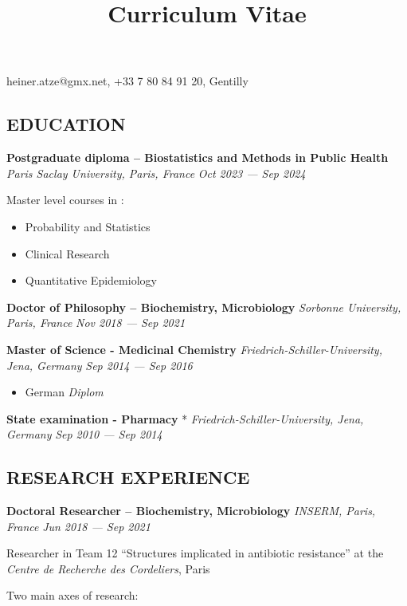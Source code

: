\documentclass[
  letterpaper,
  DIV=11,
  numbers=noendperiod]{scrartcl}
\title{Curriculum Vitae}
\author{}
\date{}
\providecommand{\tightlist}{%
  \setlength{\itemsep}{0pt}\setlength{\parskip}{0pt}}\usepackage{longtable,booktabs,array}
\begin{document}
\maketitle


heiner.atze@gmx.net, +33 7 80 84 91 20, Gentilly

\subsection{EDUCATION}\label{education}

\textbf{Postgraduate diploma -- Biostatistics and Methods in Public
Health} \emph{Paris Saclay University, Paris, France} {\emph{Oct 2023
--- Sep 2024}}

Master level courses in :

\begin{itemize}
\tightlist
\item
  Probability and Statistics
\item
  Clinical Research
\item
  Quantitative Epidemiology
\end{itemize}

\textbf{Doctor of Philosophy -- Biochemistry, Microbiology}
\emph{Sorbonne University, Paris, France} {\emph{Nov 2018 --- Sep 2021}}

\textbf{Master of Science - Medicinal Chemistry}
\emph{Friedrich-Schiller-University, Jena, Germany} {\emph{Sep 2014 ---
Sep 2016}}

\begin{itemize}
\tightlist
\item
  German \emph{Diplom}
\end{itemize}

\textbf{State examination - Pharmacy} *
\emph{Friedrich-Schiller-University, Jena, Germany} {\emph{Sep 2010 ---
Sep 2014}}

\subsection{RESEARCH EXPERIENCE}\label{research-experience}

\textbf{Doctoral Researcher -- Biochemistry, Microbiology} \emph{INSERM,
Paris, France} {\emph{Jun 2018 --- Sep 2021}}

Researcher in Team 12 ``Structures implicated in antibiotic resistance''
at the \emph{Centre de Recherche des Cordeliers}, Paris

Two main axes of research:
\end{document}
